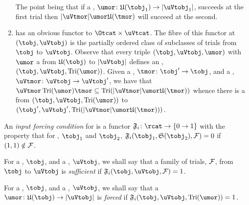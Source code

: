 \documentclass[%
12pt,%
arxiv,%
defaults
]{myclass}
\begin{document}
\begin{remark}
\begin{enumerate}
\begin{centre}
\end{centre}

The point being that if a \umor, \(\umor \colon \ufunc(\tobj_1) \to \abs{\uVtobj_1}\), succeeds at the first trial then \(\abs{\uVtmor} \umor \ufunc(\tmor)\) will succeed at the second.

\item \rcatu has an obvious functor to \(\Otcat \times \uVtcat\).
The fibre of this functor at \((\tobj, \uVtobj)\) is the partially ordered class of subclasses of trials from \(\tobj\) to \(\uVtobj\).
Observe that every triple \((\tobj, \uVtobj, \umor)\) with \(\umor\) a \umor from \(\ufunc(\tobj)\) to \(\abs{\uVtobj}\) defines an \robj, \((\tobj, \uVtobj, \trials{\umor})\).
Given a \tmor, \(\tmor \colon \tobj' \to \tobj\), and a \uVtmor, \(\uVtmor \colon \uVtobj \to \uVtobj'\), we have that \(\uVtmor \trials{\umor} \tmor \subseteq \trials{\abs{\uVtmor} \umor \ufunc(\tmor)}\) whence there is a \rmor from \((\tobj, \uVtobj, \trials{\umor})\) to \((\tobj', \uVtobj', \trials{\abs{\uVtmor} \umor \ufunc(\tmor)})\).
\end{enumerate}
\end{remark}

\begin{defn}
\label{def:forcing}
An \emph{input forcing condition} for \uVtobjs is a functor \(\iforce \colon \rcat \to \{0 \to 1\}\) with the property that for \tobjs, \(\tobj_1\) and \(\tobj_2\), \(\iforce(\tobj_1, \sfunc(\tobj_2), \m{F}) = 0\) if \((1,1) \notin \mathcal{F}\).

For a \tobj, \(\tobj\), and a \uVtobj, \(\uVtobj\), we shall say that a family of trials, \(\mathcal{F}\), from \(\tobj\) to \(\uVtobj\) is \emph{sufficient} if \(\iforce(\tobj, \uVtobj, \m{F}) = 1\).

For a \tobj, \(\tobj\), and a \uVtobj, \(\uVtobj\), we shall say that a \umor \(\umor \colon \ufunc(\tobj) \to \abs{\uVtobj}\) is \emph{forced} if \(\iforce(\tobj, \uVtobj, \trials{\umor}) = 1\).
\end{defn}
\end{document}
